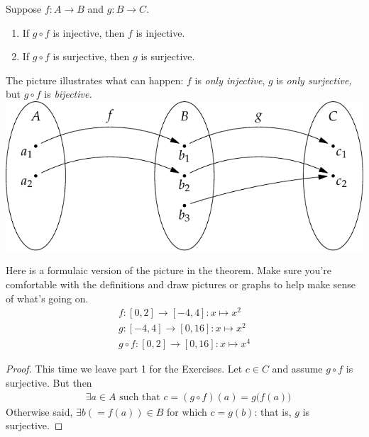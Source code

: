 \begin{thm}[lower separated=false, sidebyside, sidebyside align=top seam, sidebyside gap=0pt, righthand width=0.4\linewidth]{}{}
Suppose $f:A\to B$ and $g:B\to C$.
\begin{enumerate}
  \item If $g\circ f$ is injective, then $f$ is injective.
  \item If $g\circ f$ is surjective, then $g$ is surjective.
\end{enumerate}
The picture illustrates what can happen: $f$ is \emph{only injective}, $g$ is \emph{only surjective,} but $g\circ f$ is \emph{bijective.}
	\tcblower
	\flushright
	\includegraphics[scale=1]{sets-17-injcomp}
\end{thm}


\goodbreak

\begin{example}{}{}
	Here is a formulaic version of the picture in the theorem. Make sure you're comfortable with the definitions and draw pictures or graphs to help make sense of what's going on.
	\begin{gather*}
		f:[0,2]\to[-4,4]:x\mapsto x^2\tag{injective only}\\
		g:[-4,4]\to [0,16]:x\mapsto x^2\tag{surjective only}\\
		g\circ f:[0,2]\to[0,16]:x\mapsto x^4\tag{bijective!}
	\end{gather*}
\end{example}


\begin{proof}
	This time we leave part 1 for the Exercises. Let $c\in C$ and assume $g\circ f$ is surjective. But then
	\begin{align*}
		&\exists a\in A\text{ such that } c=(g\circ f)(a)=g\bigl(f(a)\bigr)
	\end{align*}
	Otherwise said, $\exists b(=f(a))\in B$ for which $c=g(b)$: that is, $g$ is surjective.%
\end{proof}


